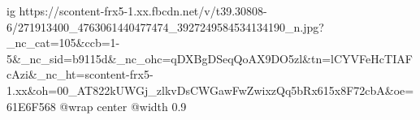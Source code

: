  
 
 
 
 

\ifcmt
  ig https://scontent-frx5-1.xx.fbcdn.net/v/t39.30808-6/271913400_4763061440477474_3927249584534134190_n.jpg?_nc_cat=105&ccb=1-5&_nc_sid=b9115d&_nc_ohc=qDXBgDSeqQoAX9DO5zl&tn=lCYVFeHcTIAFcAzi&_nc_ht=scontent-frx5-1.xx&oh=00_AT822kUWGj_zlkvDsCWGawFwZwixzQq5bRx615x8F72cbA&oe=61E6F568
	@wrap center
	@width 0.9
\fi
